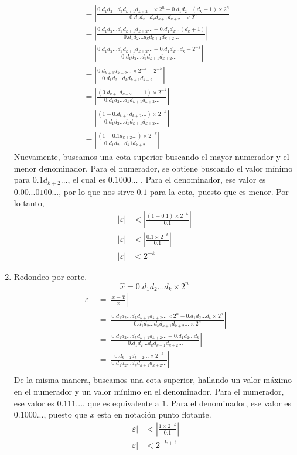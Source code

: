 \begin{enumerate}
\begin{align*}
&= \left|\frac{0.d_1d_2...d_kd_{k+1}d_{k+2}...\times2^n - 0.d_1d_2...(d_k+1)\times2^n}{0.d_1d_2...d_kd_{k+1}d_{k+2}...\times2^n}\right|\\
&= \left|\frac{0.d_1d_2...d_kd_{k+1}d_{k+2}... - 0.d_1d_2...(d_k+1)}{0.d_1d_2...d_kd_{k+1}d_{k+2}...}\right|\\
&= \left|\frac{0.d_1d_2...d_kd_{k+1}d_{k+2}... - 0.d_1d_2...d_k -2^{-k} }{0.d_1d_2...d_kd_{k+1}d_{k+2}...}\right|\\ 
&=\left| \frac{0.d_{k+1}d_{k+2}...\times2^{-k}-2^{-k}}{0.d_1d_2...d_kd_{k+1}d_{k+2}...} \right|\\
&=\left| \frac{(0.d_{k+1}d_{k+2}...-1)\times2^{-k}}{0.d_1d_2...d_kd_{k+1}d_{k+2}...} \right|\\
&=\left| \frac{(1-0.d_{k+1}d_{k+2}...)\times2^{-k}}{0.d_1d_2...d_kd_{k+1}d_{k+2}...} \right|\\
&=\left| \frac{(1-0.1d_{k+2}...)\times2^{-k}}{0.d_1d_2...d_k1d_{k+2}...} \right|
\end{align*}
Nuevamente, buscamos una cota superior buscando el mayor numerador y el menor denominador. Para el numerador, se obtiene buscando el valor mínimo para $0.1d_{k+2}...$, el cual es $0.1000...$ . Para el denominador, ese valor es $0.00...0100...$, por lo que nos sirve $0.1$ para la cota, puesto que es menor. Por lo tanto,
\begin{align*}
    |\varepsilon| &< \left| \frac{(1-0.1)\times2^{-k}}{0.1} \right|\\
    |\varepsilon| &< \left| \frac{0.1\times2^{-k}}{0.1} \right|\\
    |\varepsilon| &< 2^{-k}
\end{align*}

\item Redondeo por corte.\\
$$\hat{x}=0.d_1d_2...d_k\times2^n$$
\begin{align*}
|\varepsilon| &= \left|\frac{x - \hat{x}}{x}\right|\\
&= \left|\frac{0.d_1d_2...d_kd_{k+1}d_{k+2}...\times2^n - 0.d_1d_2...d_k\times2^n}{0.d_1d_2...d_kd_{k+1}d_{k+2}...\times2^n}\right|\\
&= \left|\frac{0.d_1d_2...d_kd_{k+1}d_{k+2}... - 0.d_1d_2...d_k}{0.d_1d_2...d_kd_{k+1}d_{k+2}...}\right|\\
&=\left| \frac{0.d_{k+1}d_{k+2}...\times2^{-k}}{0.d_1d_2...d_kd_{k+1}d_{k+2}...} \right|\\
\end{align*}
De la misma manera, buscamos una cota superior, hallando un valor máximo en el numerador y un valor mínimo en el denominador. Para el numerador, ese valor es $0.111...$, que es equivalente a $1$. Para el denominador, ese valor es $0.1000...$, puesto que $x$ esta en notación punto flotante.  
\begin{align*}
    |\varepsilon| &< \left| \frac{1\times2^{-k}}{0.1} \right|\\
    |\varepsilon| &< 2^{-k+1}
\end{align*}
\end{enumerate}

